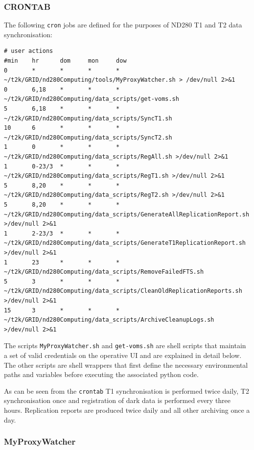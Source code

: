 \documentclass[11pt]{article}
\begin{document}
\subsubsection*{CRONTAB}
The following \verb+cron+ jobs are defined for the purposes of ND280
T1 and T2 data synchronisation:
{\tiny
\begin{verbatim}
# user actions
#min    hr      dom     mon     dow 
0       *       *       *       *     ~/t2k/GRID/nd280Computing/tools/MyProxyWatcher.sh > /dev/null 2>&1
0       6,18    *       *       *     ~/t2k/GRID/nd280Computing/data_scripts/get-voms.sh
5       6,18    *       *       *     ~/t2k/GRID/nd280Computing/data_scripts/SyncT1.sh
10      6       *       *       *     ~/t2k/GRID/nd280Computing/data_scripts/SyncT2.sh
1       0       *       *       *     ~/t2k/GRID/nd280Computing/data_scripts/RegAll.sh >/dev/null 2>&1
1       0-23/3  *       *       *     ~/t2k/GRID/nd280Computing/data_scripts/RegT1.sh >/dev/null 2>&1
5       8,20    *       *       *     ~/t2k/GRID/nd280Computing/data_scripts/RegT2.sh >/dev/null 2>&1
5       8,20    *       *       *     ~/t2k/GRID/nd280Computing/data_scripts/GenerateAllReplicationReport.sh >/dev/null 2>&1
1       2-23/3  *       *       *     ~/t2k/GRID/nd280Computing/data_scripts/GenerateT1ReplicationReport.sh >/dev/null 2>&1
1       23      *       *       *     ~/t2k/GRID/nd280Computing/data_scripts/RemoveFailedFTS.sh
5       3       *       *       *     ~/t2k/GRID/nd280Computing/data_scripts/CleanOldReplicationReports.sh >/dev/null 2>&1
15      3       *       *       *     ~/t2k/GRID/nd280Computing/data_scripts/ArchiveCleanupLogs.sh >/dev/null 2>&1 
\end{verbatim}
}
The scripts \verb+MyProxyWatcher.sh+ and \verb+get-voms.sh+ are shell
scripts that maintain a set of valid credentials on the operative UI
and are explained in detail below. The other scripts are shell wrappers
that first define the necessary environmental paths and variables
before executing the associated python code.

As can be seen from the \verb+crontab+ T1 synchronisation is
performed twice daily, T2 synchronisation once and registration of
dark data is performed every three hours. Replication reports are
produced twice daily and all other archiving once a day.

\subsubsection*{MyProxyWatcher}
\end{document}

